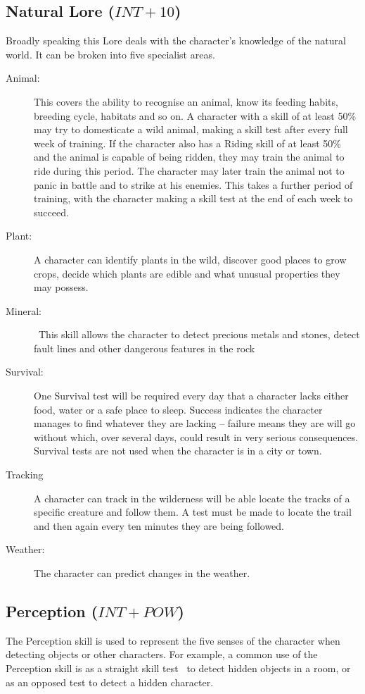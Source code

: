 \subsection{Natural Lore ($INT+10$)}
Broadly speaking this Lore deals with the character’s knowledge of the natural world. It can be broken into five specialist areas.
\begin{description}
	\item[Animal:] This covers the ability to recognise an animal, know its feeding habits, breeding cycle, habitats and so on. A character with a skill of at least 50\% may try to domesticate a wild animal, making a skill test after every full week of training. If the character also has a Riding skill of at least 50\% and the animal is capable of being ridden, they may train the animal to ride during this period. The character may later train the animal not to panic in battle and to strike at his enemies. This takes a further period of training, with the character making a skill test at the end of each week to succeed. 
	\item[Plant:] A character can identify plants in the wild, discover good places to grow crops, decide which plants are edible and what unusual properties they may possess. 
	\item[Mineral:]  This skill allows the character to detect precious metals and stones, detect fault lines and other dangerous features in the rock
	\item[Survival:] One Survival test will be required every day that a character lacks either food, water or a safe place to sleep. Success indicates the character manages to find whatever they are lacking – failure means they are will go without which, over several days, could result in very serious consequences. Survival tests are not used when the character is in a city or town. 
	\item[Tracking] A character can track in the wilderness will be able locate the tracks of a specific creature and follow them. A test must be made to locate the trail and then again every ten minutes they are being followed. 
	\item[Weather:] The character can predict changes in the weather.
\end{description}

\subsection{Perception ($INT+POW$)}
The Perception skill is used to represent the five senses of the character when detecting objects or other characters. For example, a common use of the Perception skill is as a straight skill test  to detect hidden objects in a room, or as an opposed test to detect a hidden character.

